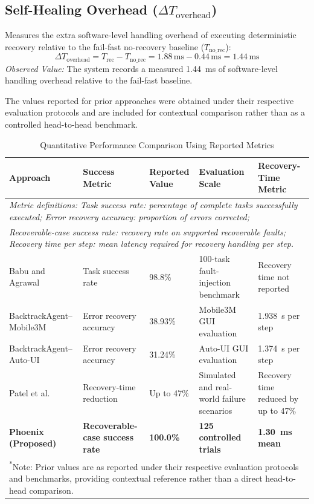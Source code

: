 \documentclass[conference]{IEEEtran}
\newcommand{\chg}[1]{{\color{blue}#1}}
\begin{document}
\subsection{Self-Healing Overhead ($\Delta T_{\text{overhead}}$)}
Measures the extra software-level handling overhead of executing deterministic recovery relative to the fail-fast no-recovery baseline ($T_{\text{no\_rec}}$):
\begin{equation}
\Delta T_{\text{overhead}} = T_{\text{rec}} - T_{\text{no\_rec}} = 1.88\,\text{ms} - 0.44\,\text{ms} = 1.44\,\text{ms}
\end{equation}
\textit{Observed Value:} The system records a measured 1.44~ms of software-level handling overhead relative to the fail-fast baseline.

The values reported for prior approaches were obtained under their respective evaluation protocols and are included for contextual comparison rather than as a controlled head-to-head benchmark.

\begin{table}[t]
\centering
\caption{Quantitative Performance Comparison Using Reported Metrics}
\label{tab:performance_comparison}
\footnotesize
\begin{tabularx}{\textwidth}{p{}p{}p{}p{}X}
\toprule
\textbf{Approach} & \textbf{Success Metric} & \textbf{Reported Value} & \textbf{Evaluation Scale} & \textbf{Recovery-Time Metric} \\
\midrule
\multicolumn{5}{l}{\chg{\textit{Metric definitions: Task success rate: percentage of complete tasks successfully executed; Error recovery accuracy: proportion of errors corrected;}}} \\
\multicolumn{5}{l}{\chg{\textit{Recoverable-case success rate: recovery rate on supported recoverable faults; Recovery time per step: mean latency required for recovery handling per step.}}} \\
\midrule
Babu and Agrawal~\cite{babu2026} & Task success rate & 98.8\% & 100-task fault-injection benchmark & Recovery time not reported \\
BacktrackAgent--Mobile3M~\cite{wu2025} & Error recovery accuracy & 38.93\% & Mobile3M GUI evaluation & 1.938~s per step \\
BacktrackAgent--Auto-UI~\cite{wu2025} & Error recovery accuracy & 31.24\% & Auto-UI GUI evaluation & 1.374~s per step \\
Patel et al.~\cite{patel2026b} & Recovery-time reduction & Up to 47\% & Simulated and real-world failure scenarios & Recovery time reduced by up to 47\% \\
\textbf{Phoenix (Proposed)} & \textbf{Recoverable-case success rate} & \textbf{100.0\%} & \textbf{125 controlled trials} & \textbf{1.30~ms mean} \\
\bottomrule
\multicolumn{5}{p{\textwidth}}{\chg{\textsuperscript{*}Note: Prior values are as reported under their respective evaluation protocols and benchmarks, providing contextual reference rather than a direct head-to-head comparison.}}
\end{tabularx}
\end{table}
\end{document}
